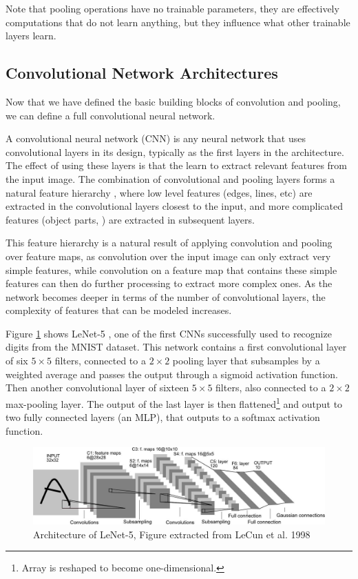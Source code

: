 Note that pooling operations have no trainable parameters, they are effectively computations that do not learn anything, but they influence what other trainable layers learn.

\subsection{Convolutional Network Architectures}

Now that we have defined the basic building blocks of convolution and pooling, we can define a full convolutional neural network.

A convolutional neural network (CNN) is any neural network that uses convolutional layers in its design, typically as the first layers in the architecture. The effect of using these layers is that the learn to extract relevant features from the input image. The combination of convolutional and pooling layers forms a natural feature hierarchy \cite{zeiler2014visualizing}, where low level features (edges, lines, etc) are extracted in the convolutional layers closest to the input, and more complicated features (object parts, ) are extracted in subsequent layers.

This feature hierarchy is a natural result of applying convolution and pooling over feature maps, as convolution over the input image can only extract very simple features, while convolution on a feature map that contains these simple features can then do further processing to extract more complex ones. As the network becomes deeper in terms of the number of convolutional layers, the complexity of features that can be modeled increases.

Figure \ref{background:lenet5} shows LeNet-5 \cite{lecun1998gradient}, one of the first CNNs successfully used to recognize digits from the MNIST dataset. This network contains a first convolutional layer of six $5 \times 5$ filters, connected to a $2 \times 2$ pooling layer that subsamples by a weighted average and passes the output through a sigmoid activation function. Then another convolutional layer of sixteen $5 \times 5$ filters, also connected to a $2 \times 2$ max-pooling layer. The output of the last layer is then flattened\footnote{Array is reshaped to become one-dimensional.} and output to two fully connected layers (an MLP), that outputs to a softmax activation function.

\begin{figure}
    \centering
    \includegraphics[width = 0.95 \textwidth]{chapters/images/lenet5.jpg}
    \caption[Architecture of LeNet-5]{Architecture of LeNet-5, Figure extracted from LeCun et al. 1998}
    \label{background:lenet5}
\end{figure}

